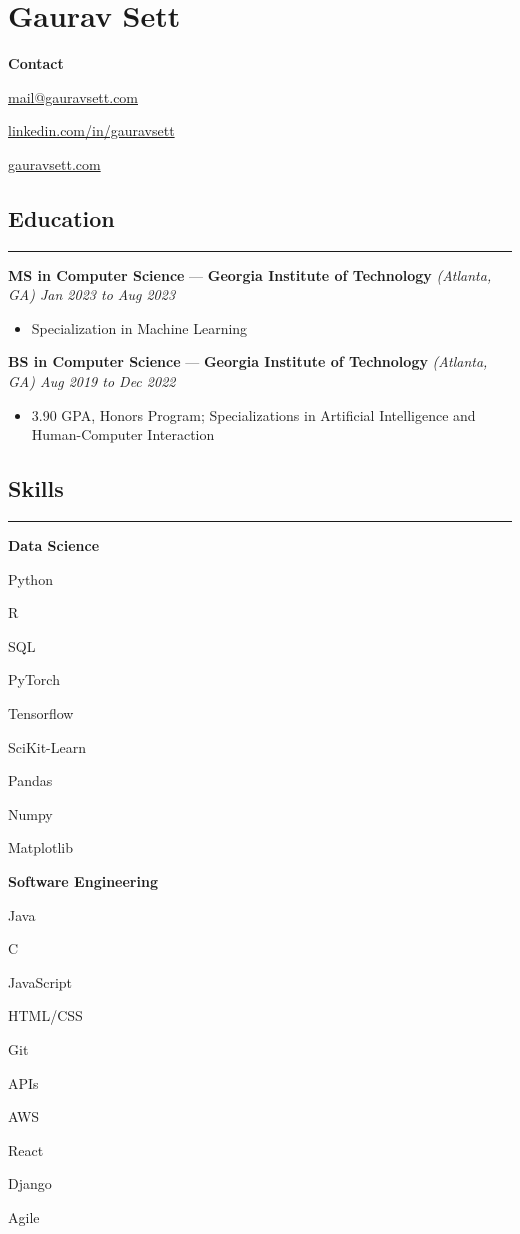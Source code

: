 \documentclass[10pt]{article}
\newcommand{\resumeHeading}[1]{
    \subsection*{#1}
    \hrule
    \vspace*{5pt}
}
\newcommand{\resumeSubHeading}[4]{
    \vspace*{5pt}
    \textbf{#1} — \textbf{#2} \textsl{(#3) \hfill #4}
}
\newcommand{\resumeListHeading}[1]{\vspace*{5pt}\textbf{#1}}
\begin{document}
\section*{Gaurav Sett}

\textbf{Contact}
\begin{itemize*}[label=$|$]
    \item \href{mailto:mail@gauravsett.com}{mail@gauravsett.com}
    \item \href{https://linkedin.com/in/gauravsett}{linkedin.com/in/gauravsett}
    \item \href{https://gauravsett.com}{gauravsett.com}
\end{itemize*}



\resumeHeading{Education}

\resumeSubHeading
    {MS in Computer Science}
    {Georgia Institute of Technology}
    {Atlanta, GA}
    {Jan 2023 to Aug 2023}
\begin{itemize}
    \item %
        Specialization in Machine Learning
\end{itemize}

\resumeSubHeading
    {BS in Computer Science}
    {Georgia Institute of Technology}
    {Atlanta, GA}
    {Aug 2019 to Dec 2022}
\begin{itemize}
    \item 3.90 GPA, Honors Program;\: 
        Specializations in Artificial Intelligence and Human-Computer Interaction
\end{itemize}



\resumeHeading{Skills}

\resumeListHeading{Data Science}
\begin{itemize*}[label=$|$]
    \item Python
    \item R
    \item SQL
    \item PyTorch
    \item Tensorflow
    \item SciKit-Learn
    \item Pandas
    \item Numpy
    \item Matplotlib
\end{itemize*}

\resumeListHeading{Software Engineering}
\begin{itemize*}[label=$|$]
    \item Java
    \item C
    \item JavaScript 
    \item HTML/CSS 
    \item Git
    \item APIs
    \item AWS
    \item React
    \item Django
    \item Agile
\end{itemize*}
\end{document}

